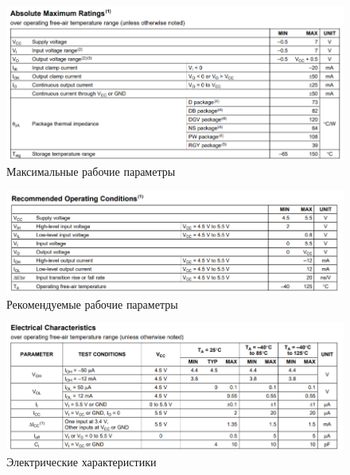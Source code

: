 \begin{figure}[H]
	\centering
	\includegraphics[width=0.95\linewidth]{imgs/3/ti2}
	\caption{Максимальные рабочие параметры}
	\label{fig:3_ti2}
\end{figure}

\begin{figure}[H]
	\centering
	\includegraphics[width=0.95\linewidth]{imgs/3/ti3}
	\caption{Рекомендуемые рабочие параметры}
	\label{fig:3_ti3}
\end{figure}

\begin{figure}[H]
	\centering
	\includegraphics[width=0.95\linewidth]{imgs/3/ti4}
	\caption{Электрические характеристики}
	\label{fig:3_ti4}
\end{figure}